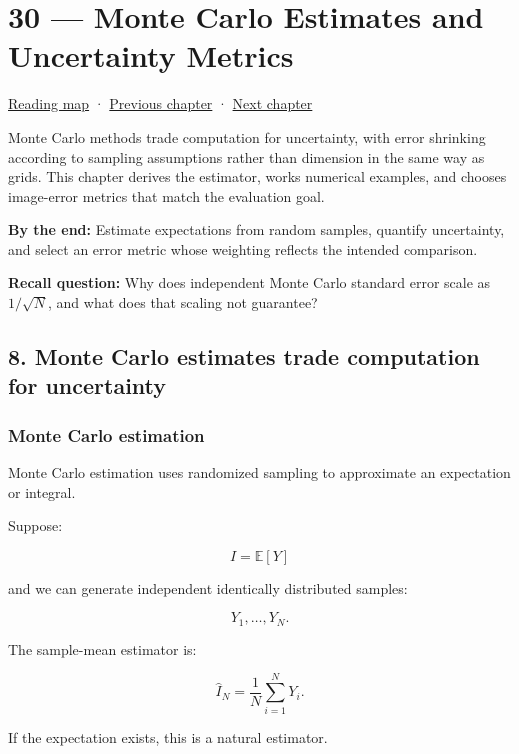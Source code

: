 \hypertarget{02-foundations-ii-ch030}{}
\chapter{30 --- Monte Carlo Estimates and Uncertainty Metrics}\label{02-foundations-ii-ch030-monte-carlo-estimates-and-uncertainty-metrics}

\hyperref[volume-reading-map]{Reading map} · \hyperref[02-foundations-ii-ch029]{Previous chapter} · \hyperref[02-foundations-ii-ch031]{Next chapter}

Monte Carlo methods trade computation for uncertainty, with error shrinking according to sampling assumptions rather than dimension in the same way as grids. This chapter derives the estimator, works numerical examples, and chooses image-error metrics that match the evaluation goal.

\textbf{By the end:} Estimate expectations from random samples, quantify uncertainty, and select an error metric whose weighting reflects the intended comparison.

\textbf{Recall question:} Why does independent Monte Carlo standard error scale as \(1/\sqrt{N}\), and what does that scaling not guarantee?

\section{8. Monte Carlo estimates trade computation for uncertainty}\label{02-foundations-ii-ch030-monte-carlo-estimates-trade-computation-for-uncertainty}

\subsection{Monte Carlo estimation}\label{02-foundations-ii-ch030-monte-carlo-estimation}

Monte Carlo estimation uses randomized sampling to approximate an expectation or integral.

Suppose:

\[
 I=\mathbb E[Y]
\]

and we can generate independent identically distributed samples:

\[
 Y_1,\ldots,Y_N.
\]

The sample-mean estimator is:

\[
 \boxed{ \widehat I_N= \frac1N\sum_{i=1}^NY_i }.
\]

If the expectation exists, this is a natural estimator.

